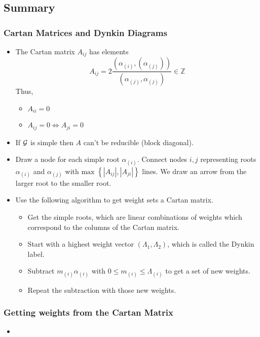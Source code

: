 \subsection{Summary}

\subsubsection{Cartan Matrices and Dynkin Diagrams}
\begin{itemize}
	\item The Cartan matrix $ A_{ ij } $ has elements 
		\[
			A _{ ij }  = 2 \frac{ \left(  \alpha _{ \left( i  \right)  }, 
			\left( \alpha _{ \left( j  \right)  }  \right)  \right) }{ 
		\left( \alpha _{ \left( j  \right)  } , \alpha _{ \left( j  \right) } \right) } \in \mathbb{ Z } 
		\] Thus, 
		\begin{itemize}
			\item  $ A_{ ii }  = 0 $
			\item $ A _{ ij } = 0 \iff A _{ ji }  = 0 $
		\end{itemize}
	\item If $ \mathcal{ G } $ is simple then $ A $ can't 
		be reducible (block diagonal). 
	\item Draw a node for each simple root $ \alpha_{ \left( i  \right)  }$. 
		Connect nodes $ i , j $ representing 
		roots $ \alpha _{ \left( i  \right)  } $ and $ \alpha _{ \left( j  \right)  }$ with $ \text{max } \left\{  |A_{ij  } | , | A_{ ji } |  \right\} $ lines. We draw an arrow 
		from the larger root to the smaller root.
	\item Use the following algorithm to get weight 
		sets a Cartan matrix. 
	\begin{itemize}
		\item Get the simple roots, which are 
			linear combinations of weights which 
			correspond to the columns of the Cartan matrix. 
		\item Start with a highest weight vector $ \left( \Lambda_1 , \Lambda_2  \right)   $, 
			which is called the Dynkin label. 
		\item Subtract $ m_{ \left( i  \right) }\alpha_{ \left( i  \right) }$ with $0 \le   m_{ \left( i  \right) } \le  \Lambda_{ \left( i  \right) } $ to get a set of new weights. 
		\item Repeat the subtraction with those new weights. 
	\end{itemize}
\end{itemize}

\subsubsection{Getting weights from the Cartan Matrix}
\begin{itemize}
	\item 
\end{itemize}

